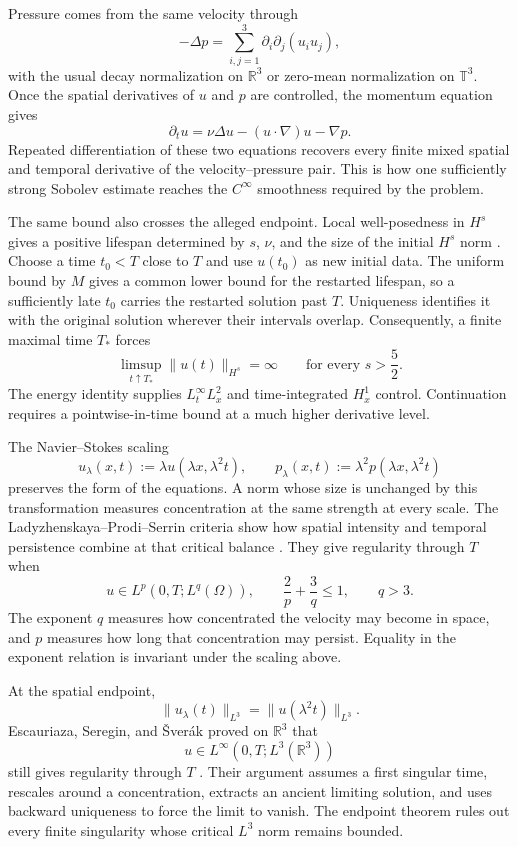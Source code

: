 Pressure comes from the same velocity through
\[
  -\Delta p
  =
  \sum_{i,j=1}^{3}
  \partial_i\partial_j(u_i u_j),
\]
with the usual decay normalization on \(\mathbb R^3\) or zero-mean normalization on \(\mathbb T^3\).
Once the spatial derivatives of \(u\) and \(p\) are controlled, the momentum equation gives
\[
  \partial_tu
  =
  \nu\Delta u-(u\cdot\nabla)u-\nabla p.
\]
Repeated differentiation of these two equations recovers every finite mixed spatial and temporal derivative of the velocity--pressure pair.
This is how one sufficiently strong Sobolev estimate reaches the \(C^\infty\) smoothness required by the problem.

The same bound also crosses the alleged endpoint.
Local well-posedness in \(H^s\) gives a positive lifespan determined by \(s\), \(\nu\), and the size of the initial \(H^s\) norm \parencite{FujitaKato1964,Kato1984}.
Choose a time \(t_0<T\) close to \(T\) and use \(u(t_0)\) as new initial data.
The uniform bound by \(M\) gives a common lower bound for the restarted lifespan, so a sufficiently late \(t_0\) carries the restarted solution past \(T\).
Uniqueness identifies it with the original solution wherever their intervals overlap.
Consequently, a finite maximal time \(T_*\) forces
\[
  \limsup_{t\uparrow T_*}
  \lVert u(t)\rVert_{H^s}
  =
  \infty
  \qquad
  \text{for every }s>\frac52.
\]
The energy identity supplies \(L^\infty_tL^2_x\) and time-integrated \(H^1_x\) control.
Continuation requires a pointwise-in-time bound at a much higher derivative level.


The Navier--Stokes scaling
\[
  u_\lambda(x,t)
  :=
  \lambda u(\lambda x,\lambda^2t),
  \qquad
  p_\lambda(x,t)
  :=
  \lambda^2p(\lambda x,\lambda^2t)
\]
preserves the form of the equations.
A norm whose size is unchanged by this transformation measures concentration at the same strength at every scale.
The Ladyzhenskaya--Prodi--Serrin criteria show how spatial intensity and temporal persistence combine at that critical balance \parencite{Prodi1959,Serrin1962,Serrin1963,Ladyzhenskaya1967}.
They give regularity through \(T\) when
\[
  u\in L^p(0,T;L^q(\Omega)),
  \qquad
  \frac{2}{p}+\frac{3}{q}\leq1,
  \qquad
  q>3.
\]
The exponent \(q\) measures how concentrated the velocity may become in space, and \(p\) measures how long that concentration may persist.
Equality in the exponent relation is invariant under the scaling above.

At the spatial endpoint,
\[
  \lVert u_\lambda(t)\rVert_{L^3}
  =
  \lVert u(\lambda^2t)\rVert_{L^3}.
\]
Escauriaza, Seregin, and \v{S}ver{\'a}k proved on \(\mathbb R^3\) that
\[
  u\in L^\infty(0,T;L^3(\mathbb R^3))
\]
still gives regularity through \(T\) \parencite{EscauriazaSereginSverak2003}.
Their argument assumes a first singular time, rescales around a concentration, extracts an ancient limiting solution, and uses backward uniqueness to force the limit to vanish.
The endpoint theorem rules out every finite singularity whose critical \(L^3\) norm remains bounded.

